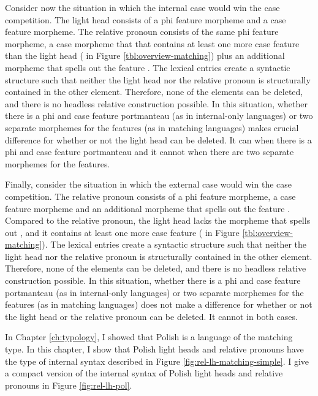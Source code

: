 Consider now the situation in which the internal case would win the case competition. The light head consists of a phi feature morpheme and a case feature morpheme. The relative pronoun consists of the same phi feature morpheme, a case morpheme that that contains at least one more case feature than the light head ( in Figure \ref{tbl:overview-matching}) plus an additional morpheme that spells out the feature . The lexical entries create a syntactic structure such that neither the light head nor the relative pronoun is structurally contained in the other element. Therefore, none of the elements can be deleted, and there is no headless relative construction possible.
In this situation, whether there is a phi and case feature portmanteau (as in internal-only languages) or two separate morphemes for the features (as in matching languages) makes crucial difference for whether or not the light head can be deleted. It can when there is a phi and case feature portmanteau and it cannot when there are two separate morphemes for the features.

Finally, consider the situation in which the external case would win the case competition. The relative pronoun consists of a phi feature morpheme, a case feature morpheme and an additional morpheme that spells out the feature . Compared to the relative pronoun, the light head lacks the morpheme that spells out , and it contains at least one more case feature ( in Figure \ref{tbl:overview-matching}). The lexical entries create a syntactic structure such that neither the light head nor the relative pronoun is structurally contained in the other element. Therefore, none of the elements can be deleted, and there is no headless relative construction possible.
In this situation, whether there is a phi and case feature portmanteau (as in internal-only languages) or two separate morphemes for the features (as in matching languages) does not make a difference for whether or not the light head or the relative pronoun can be deleted. It cannot in both cases.

In Chapter \ref{ch:typology}, I showed that Polish is a language of the matching type. In this chapter, I show that Polish light heads and relative pronouns have the type of internal syntax described in Figure \ref{fig:rel-lh-matching-simple}. I give a compact version of the internal syntax of Polish light heads and relative pronouns in Figure \ref{fig:rel-lh-pol}.

